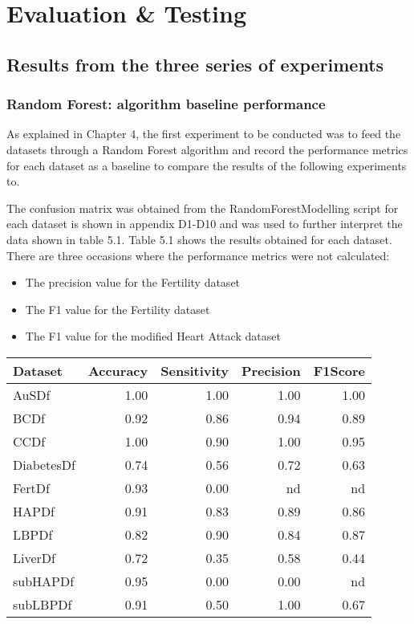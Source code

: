 \chapter{Evaluation \& Testing}\label{ch:Evaluation}

\section{Results from the three series of experiments}
\subsection{Random Forest: algorithm baseline performance}
As explained in Chapter 4, the first experiment to be conducted was to feed the datasets through  a Random Forest algorithm and record the performance metrics for each dataset as a baseline to compare the results of the following experiments to.

The confusion matrix was obtained from the RandomForestModelling script for each dataset is shown in appendix D1-D10 and was used to further interpret the data shown in table 5.1.\newline
Table 5.1 shows the results obtained for each dataset. There are three occasions where the performance metrics were not calculated:
\begin{itemize}
    \item The precision value for the Fertility dataset
    \item The F1 value for the Fertility dataset
    \item The F1 value for the modified Heart Attack dataset
\end{itemize}

\begin{table}[!htbp]
\centering
\begin{tabular}{lrrrr}
  \hline
  \rowcolor{LightCyan}
Dataset & Accuracy & Sensitivity & Precision & F1Score \\ 
  \hline
AuSDf & 1.00 & 1.00 & 1.00 & 1.00 \\ 
  BCDf & 0.92 & 0.86 & 0.94 & 0.89 \\ 
  CCDf & 1.00 & 0.90 & 1.00 & 0.95 \\ 
  DiabetesDf & 0.74 & 0.56 & 0.72 & 0.63 \\ 
  FertDf & 0.93 & 0.00 & nd & nd \\ 
  HAPDf & 0.91 & 0.83 & 0.89 & 0.86 \\ 
  LBPDf & 0.82 & 0.90 & 0.84 & 0.87 \\ 
  LiverDf & 0.72 & 0.35 & 0.58 & 0.44 \\ 
  subHAPDf & 0.95 & 0.00 & 0.00 & nd \\ 
  subLBPDf & 0.91 & 0.50 & 1.00 & 0.67 \\ 
   \hline
\end{tabular}
\end{table}

